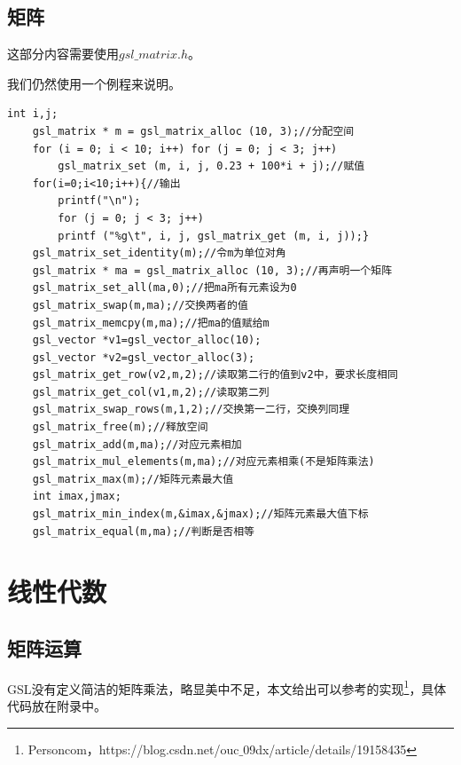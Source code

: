 \documentclass[a4paper,11pt,onecolumn,twoside]{article}
\begin{document}
\subsection{矩阵}
这部分内容需要使用$gsl\_matrix.h$。\par
我们仍然使用一个例程来说明。

\begin{lstlisting}
int i,j;
    gsl_matrix * m = gsl_matrix_alloc (10, 3);//分配空间
    for (i = 0; i < 10; i++) for (j = 0; j < 3; j++)
        gsl_matrix_set (m, i, j, 0.23 + 100*i + j);//赋值
    for(i=0;i<10;i++){//输出
        printf("\n");
        for (j = 0; j < 3; j++)
        printf ("%g\t", i, j, gsl_matrix_get (m, i, j));}
    gsl_matrix_set_identity(m);//令m为单位对角
    gsl_matrix * ma = gsl_matrix_alloc (10, 3);//再声明一个矩阵
    gsl_matrix_set_all(ma,0);//把ma所有元素设为0
    gsl_matrix_swap(m,ma);//交换两者的值
    gsl_matrix_memcpy(m,ma);//把ma的值赋给m
    gsl_vector *v1=gsl_vector_alloc(10);
    gsl_vector *v2=gsl_vector_alloc(3);
    gsl_matrix_get_row(v2,m,2);//读取第二行的值到v2中，要求长度相同
    gsl_matrix_get_col(v1,m,2);//读取第二列
    gsl_matrix_swap_rows(m,1,2);//交换第一二行，交换列同理
    gsl_matrix_free(m);//释放空间
    gsl_matrix_add(m,ma);//对应元素相加
    gsl_matrix_mul_elements(m,ma);//对应元素相乘(不是矩阵乘法)
    gsl_matrix_max(m);//矩阵元素最大值
    int imax,jmax;
    gsl_matrix_min_index(m,&imax,&jmax);//矩阵元素最大值下标
    gsl_matrix_equal(m,ma);//判断是否相等
\end{lstlisting}


\section{线性代数}
\subsection{矩阵运算}
GSL没有定义简洁的矩阵乘法，略显美中不足，本文给出可以参考的实现\footnote{Personcom，https://blog.csdn.net/ouc$\_$09dx/article/details/19158435 }，具体代码放在附录中。
\end{document}
